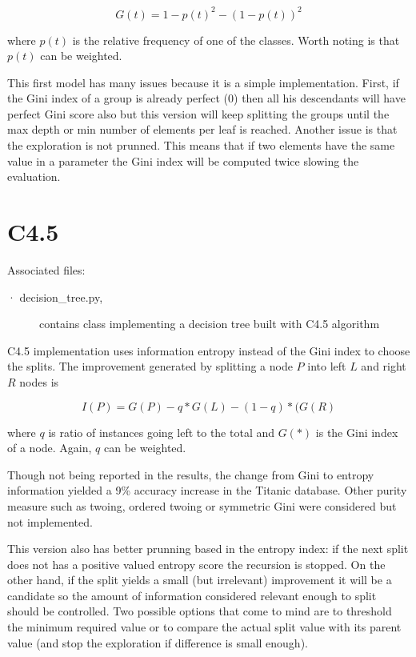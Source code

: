 \documentclass[a4paper,10pt]{article}
\begin{document}
\[G(t) = 1 - p(t)^2 - (1-p(t))^2\]

where $p(t)$ is the relative frequency of one of the classes. Worth noting is that $p(t)$ can be weighted.

This first model has many issues because it is a simple implementation. First, if the Gini index of a group is already perfect (0) then all his descendants will have perfect Gini score also but this version will keep splitting the groups until the max depth or min number of elements per leaf is reached. Another issue is that the exploration is not prunned. This means that if two elements have the same value in a parameter the Gini index will be computed twice slowing the evaluation. 


\section{C4.5}

Associated files:
\begin{description}
 \item [· decision\_tree.py,] contains class implementing a decision tree built with C4.5 algorithm
\end{description}

C4.5 implementation uses information entropy instead of the Gini index to choose the splits. The improvement generated by splitting a node $P$ into left $L$ and right $R$ nodes is

\[ I(P) = G(P) - q*G(L) - (1-q)*(G(R) \]

where $q$ is ratio of instances going left to the total and $G(*)$ is the Gini index of a node. Again, $q$ can be weighted.

Though not being reported in the results, the change from Gini to entropy information yielded a 9\% accuracy increase in the Titanic database. Other purity measure such as twoing, ordered twoing or symmetric Gini were considered but not implemented.

This version also has better prunning based in the entropy index: if the next split does not has a positive valued entropy score the recursion is stopped. On the other hand, if the split yields a small (but irrelevant) improvement it will be a candidate so the amount of information considered relevant enough to split should be controlled. Two possible options that come to mind are to threshold the minimum required value or to compare the actual split value with its parent value (and stop the exploration if difference is small enough).
\end{document}
